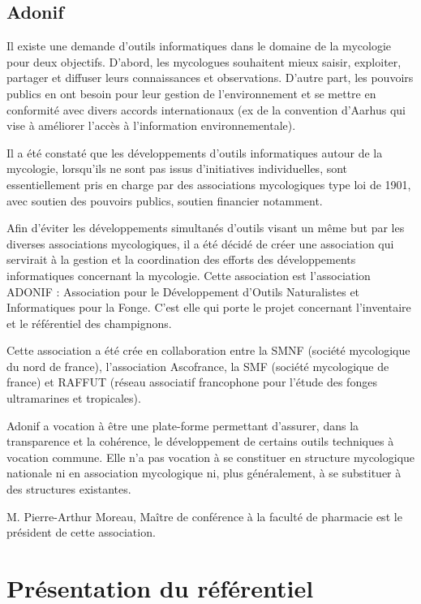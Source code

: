 \documentclass[11pt, a4paper, twoside]{report}
\begin{document}
\subsection{Adonif}
Il existe une demande d'outils informatiques dans le domaine de la mycologie pour deux objectifs. D'abord, les mycologues souhaitent mieux saisir, exploiter, partager et diffuser leurs connaissances et observations. D'autre part, les pouvoirs publics en ont besoin pour leur gestion de l'environnement et se mettre en conformité avec divers accords internationaux (ex de la convention d'Aarhus qui vise à améliorer l'accès à l'information environnementale).

Il a été constaté que les développements d'outils informatiques autour de la mycologie, lorsqu’ils ne sont pas issus d’initiatives individuelles, sont essentiellement  pris en charge par des associations mycologiques type loi de 1901, avec soutien des pouvoirs publics, soutien financier notamment.

Afin d'éviter les développements simultanés d'outils visant un même but par les diverses associations mycologiques, il a été décidé de créer une association qui servirait à la gestion et la coordination des efforts des développements informatiques concernant la mycologie. Cette association est l'association ADONIF : Association pour le Développement d'Outils Naturalistes et Informatiques pour la Fonge. C'est elle qui porte le projet concernant l'inventaire et le référentiel des champignons.

Cette association a été crée en collaboration entre la SMNF (société mycologique du nord de france), l'association Ascofrance, la SMF (société mycologique de france) et RAFFUT (réseau associatif francophone pour l’étude des fonges ultramarines et tropicales).

Adonif a vocation à être une plate-forme permettant d’assurer, dans la transparence et la cohérence, le développement de certains outils techniques à vocation commune. Elle n’a pas vocation à se constituer en structure mycologique nationale ni en association mycologique ni, plus généralement, à se substituer à des structures existantes.

M. Pierre-Arthur Moreau, Maître de conférence à la faculté de pharmacie est le président de cette association.

\section{Présentation du référentiel}
\end{document}
